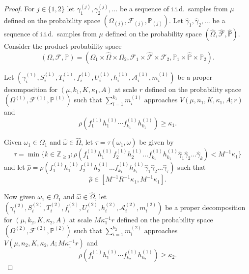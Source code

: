 \documentclass[10pt,a4paper]{amsart}
\begin{document}
\begin{proof}
    For $j \in \{ 1,2 \}$ let $\gamma_1^{(j)}, \gamma_2^{(j)}, \dots$ be a sequence of i.i.d.\ samples from $\mu$ defined on the probability space $\left(\Omega_{(j)}, \mathscr{F}_{(j)}, \mathbb{P}_{(j)}\right)$. Let $\hat{\gamma}_1, \hat{\gamma}_2, \dots$ be a sequence of i.i.d.\ samples from $\mu$ defined on the probability space $\left(\hat{\Omega}, \hat{\mathscr{F}}, \hat{\mathbb{P}}\right)$. Consider the product probability space $$\left(\Omega, \mathscr{F}, \mathbb{P}\right) = \left( \Omega_1 \times \hat{\Omega} \times \Omega_2, \mathscr{F}_1 \times \hat{\mathscr{F}} \times \mathscr{F}_2, \mathbb{P}_1 \times \hat{\mathbb{P}} \times \mathbb{P}_2 \right).$$ 

    Let $\left(\gamma_i^{(1)}, S_i^{(1)}, T_i^{(1)}, f_i^{(1)}, U_i^{(1)}, h_i^{(1)}, \mathscr{A}_i^{(1)}, m_i^{(1)}\right)$ be a proper decomposition for $(\mu, k_1, K, \kappa_1, A)$ at scale $r$ defined on the probability space $\left(\Omega^{(1)}, \mathscr{F}^{(1)}, \mathbb{P}^{(1)}\right)$ such that $\sum_{i = 1}^{k_1} m_i^{(1)}$ approaches $V(\mu,n_1,K,\kappa_1,A;r)$ and  $$ \rho(f_1^{(1)}h_1^{(1)}\cdots f_{k_1}^{(1)}h_{k_1}^{(1)}) \geq \kappa_1.$$ 

    Given $\omega_1 \in \Omega_1$ and $\hat{\omega} \in \hat{\Omega}$, let $\tau = \tau(\omega_1, \hat{\omega})$ be given by $$\tau = \min \{k \in \mathbb{Z}_{\geq 0}: \rho( f^{(1)}_1 h^{(1)}_1 f^{(1)}_2 h^{(1)}_2 \dots f^{(1)}_{k_1} h^{(1)}_{k_1} \hat{\gamma}_1 \hat{\gamma}_2 \dots \hat{\gamma}_k) < M^{-1} \kappa_1  \} $$ and let $\hat{\rho} = \rho( f^{(1)}_1 h^{(1)}_1 f^{(1)}_2 h^{(1)}_2 \dots f^{(1)}_{k_1} h^{(1)}_{k_1} \hat{\gamma}_1 \hat{\gamma}_2 \dots \hat{\gamma}_\tau)$ such that $$\hat{\rho} \in [M^{-1} R^{-1} \kappa_1 , M^{-1} \kappa_1 ]. $$

    Now given $\omega_1 \in \Omega_1$ and $\hat{\omega} \in \hat{\Omega}$, let $\left(\gamma_i^{(2)}, S_i^{(2)}, T_i^{(2)}, f_i^{(2)}, U_i^{(2)}, h_i^{(2)}, \mathscr{A}_i^{(2)}, m_i^{(2)}\right)$ be a proper decomposition for $(\mu, k_2, K, \kappa_2, A)$ at scale $M\kappa_1^{-1}r$ defined on the probability space $\left(\Omega^{(2)}, \mathscr{F}^{(2)}, \mathbb{P}^{(2)}\right)$ such that $\sum_{i = 1}^{k_2} m_i^{(2)}$ approaches $V(\mu,n_2,K,\kappa_2,A;M\kappa_1^{-1}r)$ and  $$\rho(f_1^{(1)}h_1^{(1)}\cdots f_{k_2}^{(1)}h_{k_2}^{(1)}) \geq \kappa_2.$$ 


\end{proof}
\end{document}
